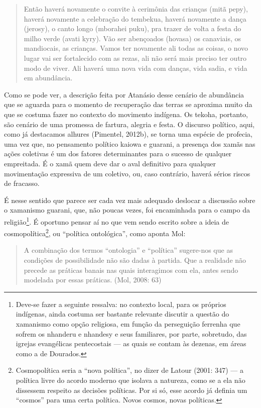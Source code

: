 \begin{quotation}
Então haverá novamente o convite à cerimônia das crianças (mitã pepy),
haverá novamente a celebração do tembekua, haverá novamente a dança
(jerosy), o canto longo (mborahei puku), pra trazer de volta a festa do
milho verde (avati kyry). Vão ser abençoados (hovasa) os canaviais, os
mandiocais, as crianças. Vamos ter novamente ali todas as coisas, o
novo lugar vai ser fortalecido com as rezas, ali não será mais preciso
ter outro modo de viver. Ali haverá uma nova vida com danças, vida
sadia, e vida em abundância.
\end{quotation}

Como se pode ver, a descrição feita por Atanásio desse cenário de
abundância que se aguarda para o momento de recuperação das terras se
aproxima muito da que se costuma fazer no contexto do movimento
indígena. Os tekoha, portanto, são cenário de uma promessa de fartura,
alegria e festa. O discurso político, aqui, como já destacamos alhures
(Pimentel, 2012b), se torna uma espécie de profecia, uma vez que, no
pensamento político kaiowa e guarani, a presença dos xamãs nas ações
coletivas é um dos fatores determinantes para o sucesso de qualquer
empreitada. É o xamã quem deve dar o aval definitivo para qualquer
movimentação expressiva de um coletivo, ou, caso contrário, haverá
sérios riscos de fracasso. 

É nesse sentido que parece ser cada vez mais adequado deslocar a
discussão sobre o xamanismo guarani, que, não poucas vezes, foi
encaminhada para o campo da religião\footnote{Deve-se fazer a seguinte
ressalva: no contexto local, para os próprios indígenas, ainda costuma
ser bastante relevante discutir a questão do xamanismo como opção
religiosa, em função da perseguição ferrenha que sofrem os nhanderu e
nhandesy e seus familiares, por parte, sobretudo, das igrejas
evangélicas pentecostais --- as quais se contam às dezenas, em áreas como
a de Dourados.}. É oportuno pensar aí no que vem sendo escrito sobre
a ideia de cosmopolítica\footnote{Cosmopolítica seria a ``nova
política'', no dizer de Latour (2001: 347) --- a política livre do acordo
moderno que isolava a natureza, como se a ela não dissessem respeito as
decisões políticas. Por si só, esse acordo já definia um ``cosmos'' para
uma certa política. Novos cosmos, novas políticas.}, ou ``política
ontológica'', como aponta Mol: 

\begin{quotation}
A combinação dos termos ``ontologia'' e ``política'' sugere-nos que as
condições de possibilidade não são dadas à partida. Que a realidade não
precede as práticas banais nas quais interagimos com ela, antes sendo
modelada por essas práticas. (Mol, 2008: 63)
\end{quotation}

